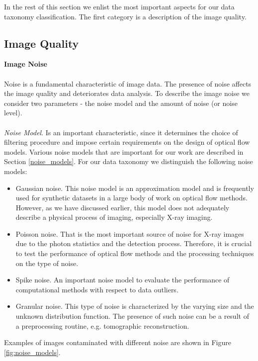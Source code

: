 In the rest of this section we enlist the most important aspects for our data taxonomy classification. The first category is a description of the image quality.





\subsection{Image Quality}
\textbf{Image Noise}
\\
\\
Noise is a fundamental characteristic of image data. The presence of noise affects the image quality and deteriorates data analysis. To describe the image noise we consider two parameters - the noise model and the amount of noise (or noise level).
\\
\\
\textit{Noise Model}. Is an important characteristic, since it determines the choice of filtering procedure and impose certain requirements on the design of optical flow models. Various noise models that are important for our work are described in Section \ref{noise_models}. 
For our data taxonomy we distinguish the following noise models:
\begin{itemize}
	\item Gaussian noise. This noise model is an approximation model and is frequently used for synthetic datasets in a large body of work on optical flow methods. However, as we have discussed earlier, this model does not adequately describe a physical process of imaging, especially X-ray imaging. 
	
	\item Poisson noise. That is the most important source of noise for X-ray images due to the photon statistics and the detection process. Therefore, it is crucial to test the performance of optical flow methods and the processing techniques on the type of noise.
	
	\item Spike noise. An important noise model to evaluate the performance of computational methods with respect to data outliers.
	
	\item Granular noise. This type of noise is characterized by the varying size and the unknown distribution function. The presence of such noise can be a result of a preprocessing routine, e.g. tomographic reconstruction.
\end{itemize}
Examples of images contaminated with different noise are shown in Figure \ref{fig:noise_models}.
